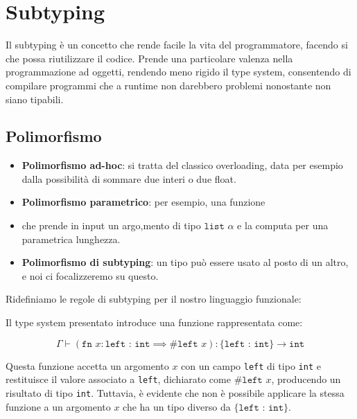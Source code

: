 \chapter{Subtyping}
Il subtyping è un concetto che rende facile la vita del programmatore, 
facendo si che possa riutilizzare il codice. Prende una particolare valenza 
nella programmazione ad oggetti, rendendo meno rigido il type system, consentendo 
di compilare programmi che a runtime non darebbero problemi nonostante non siano 
tipabili.
\section{Polimorfismo}
\begin{itemize}
    \item \textbf{Polimorfismo ad-hoc}:
    si tratta del classico overloading, data per esempio 
    dalla possibilità di sommare due interi o due float.
    \item \textbf{Polimorfismo parametrico}: per esempio, una funzione 
    \item che prende in input un argo,mento di tipo $\texttt{list }\alpha$ 
    e la computa per una parametrica lunghezza. 
    \item \textbf{Polimorfismo di subtyping}: un tipo può essere
    usato al posto di un altro, e noi ci focalizzeremo su questo.
\end{itemize}
Ridefiniamo le regole di subtyping per il nostro linguaggio funzionale:
\begin{prooftree}
\end{prooftree}
\begin{prooftree}
\end{prooftree}
Il type system presentato introduce una funzione rappresentata come:

\[
\Gamma \vdash (\texttt{fn }x : \texttt{left : int} \implies \#
\texttt{left }x): \{ \texttt{left : int} \} \rightarrow \texttt{int}
\]

Questa funzione accetta un argomento \(x\) con un campo \texttt{left}
di tipo \texttt{int} e restituisce il valore associato a \texttt{left},
dichiarato come \(\# \texttt{left }x\), producendo un risultato di tipo
\texttt{int}. Tuttavia, è evidente che non è possibile applicare la
stessa funzione a un argomento \(x\) che ha un tipo diverso da
\(\{ \texttt{left : int} \}\).

